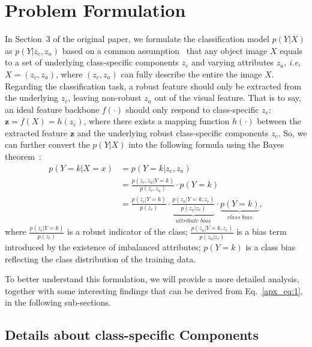 \documentclass{article}
\def\ie{\emph{i.e}} \def\Ie{\emph{I.e}}
\begin{document}
\section{Problem Formulation}
In Section~3 of the original paper, we formulate the classification model $p(Y|X)$ as $p(Y|z_c,z_a)$ based on a common assumption~\cite{mirza2014conditional} that any object image $X$ equals to a set of underlying class-specific components $z_c$ and varying attributes $z_a$, \ie, $X=(z_c,z_a)$, where $(z_c,z_a)$ can fully describe the entire the image $X$. Regarding the classification task, a robust feature should only be extracted from the underlying $z_c$, leaving non-robust $z_a$ out of the visual feature. That is to say, an ideal feature backbone $f(\cdot)$ should only respond to class-specific $z_c$: $\mathbf{z}=f(X)=h(z_c)$, where there exists a mapping function $h(\cdot)$ between the extracted feature $\mathbf{z}$ and the underlying robust class-specific components $z_c$. So, we can further convert the $p(Y|X)$ into the following formula using the Bayes theorem~\cite{stone2013bayes}:
\begin{equation}
\begin{split}
    p(Y=k|X=x)&=p(Y=k|z_c, z_a) \\
              &=\frac{p(z_c,z_a|Y=k)}{p(z_c,z_a)} \cdot p(Y=k) \\
              &=\frac{p(z_c|Y=k)}{p(z_c)} \cdot \underbrace{\frac{p(z_a|Y=k,z_c)}{p(z_a|z_c)}}_{attribute\;bias} \cdot \underbrace{p(Y=k)}_{class\;bias},
\end{split}
    \label{apx_eq:1}
\end{equation}
where $\frac{p(z_c|Y=k)}{p(z_c)}$ is a robust indicator of the class; $\frac{p(z_a|Y=k,z_c)}{p(z_a|z_c)}$ is a bias term introduced by the existence of imbalanced attributes; $p(Y=k)$ is a class bias reflecting the class distribution of the training data.

To better understand this formulation, we will provide a more detailed analysis, together with some interesting findings that can be derived from Eq.~\eqref{apx_eq:1}, in the following sub-sections.

\subsection{Details about class-specific Components}
\end{document}
